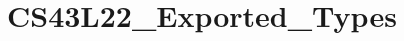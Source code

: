 \hypertarget{group___c_s43_l22___exported___types}{}\section{C\+S43\+L22\+\_\+\+Exported\+\_\+\+Types}
\label{group___c_s43_l22___exported___types}
